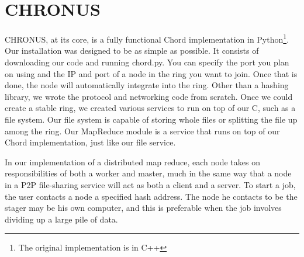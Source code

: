 \documentclass[conference, compsocconf, letterpaper]{IEEEtran}
\begin{document}




\section{CHRONUS}


CHRONUS, at its core, is a fully functional Chord implementation in Python\footnote{The original implementation is in C++}.  Our installation was designed to be as simple as possible.   It consists of downloading our code\cite{code} and running chord.py.  You can specify the port you plan on using and the IP and port of a node in the ring you want to join.  Once that is done, the node will automatically integrate into the ring.
Other than a hashing library, we wrote the protocol and networking code from scratch.  Once we could create a stable ring, we created various services to run on top of our C, such as a file system.  Our file system is capable of storing whole files or splitting the file up among the ring. Our MapReduce module is a service that runs on top of our Chord implementation, just like our file service.  


In our implementation of a distributed map reduce, each node takes on responsibilities of both a worker and master, much in the same way that a node in a P2P file-sharing service will act as both a client and a server.  To start a job, the user contacts a node a specified hash address. The node he contacts to be the stager may be his own computer, and this is preferable when the job involves dividing up a large pile of data. 
\end{document}

